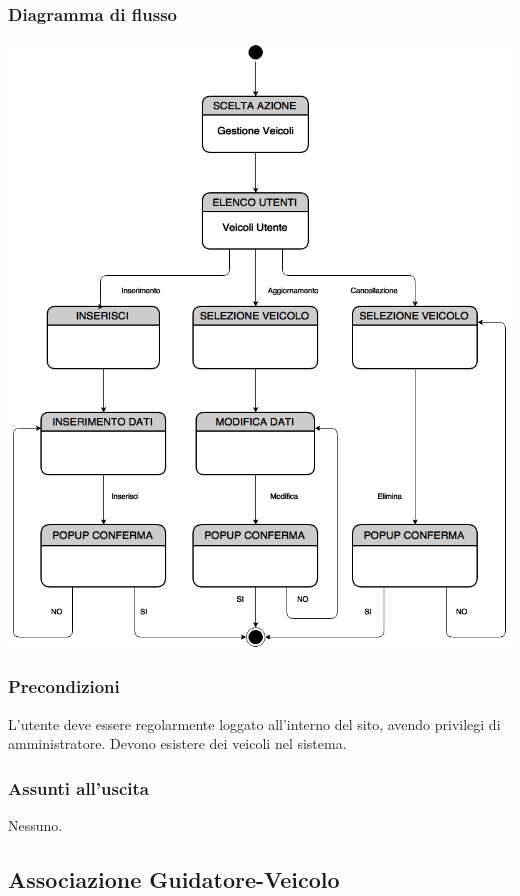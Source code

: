 \documentclass[a4paper,12pt]{article}
\begin{document}
\subsubsection{Diagramma di flusso}

\begin{center}
\includegraphics[scale=0.4]{Veicoli.png}
\end{center}
\subsubsection{Precondizioni}
L'utente deve essere regolarmente loggato all'interno del sito, avendo privilegi di amministratore. Devono esistere dei veicoli nel sistema.
\subsubsection{Assunti all'uscita}
Nessuno.



\subsection{Associazione Guidatore-Veicolo}
\end{document}
